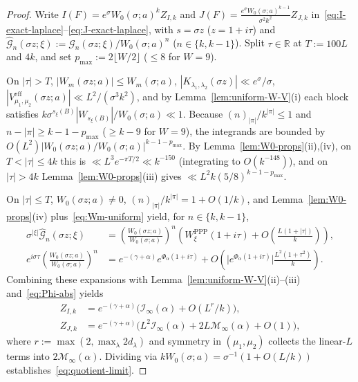 \documentclass[11pt, reqno]{amsart}
\theoremstyle{remark}
\numberwithin{equation}{section}
\newcommand{\R}{\mathbb{R}}
\newcommand{\cG}{\mathcal{G}}
\begin{document}
\begin{proof}
Write $I(F) = e^\sigma W_0(\sigma; a)^k Z_{I,k}$ and $J(F) = \frac{e^\sigma W_0(\sigma; a)^{k-1}}{\sigma^2 k^2} Z_{J,k}$
in~\eqref{eq:I-exact-laplace}--\eqref{eq:J-exact-laplace}, with $s = \sigma z$ ($z = 1+i\tau$) and
$\widehat{\cG}_n(\sigma z;\xi) := \cG_n(\sigma z;\xi)/W_0(\sigma;a)^n$ ($n \in \{k, k-1\}$). Split $\tau \in \R$
at $T := 100 L$ and $4k$, and set $p_{\max} := 2\lfloor W/2\rfloor$ ($\le 8$ for $W=9$).

On $|\tau| > T$, $|W_m(\sigma z; a)| \le W_m(\sigma; a)$, $|K_{\lambda_1,\lambda_2}(\sigma z)| \ll e^\sigma/\sigma$,
$|V_{\mu_1,\mu_2}^{\mathrm{eff}}(\sigma z; a)| \ll L^2/(\sigma^3 k^2)$, and by Lemma~\ref{lem:uniform-W-V}(i)
each block satisfies $k\sigma^{s_\xi(B)}|W_{s_\xi(B)}|/W_0(\sigma;a) \ll 1$. Because $(n)_{|\pi|}/k^{|\pi|} \le 1$
and $n - |\pi| \ge k - 1 - p_{\max}$ ($\ge k-9$ for $W=9$), the integrands are bounded by
$O(L^2)|W_0(\sigma z;a)/W_0(\sigma;a)|^{k-1-p_{\max}}$. By Lemma~\ref{lem:W0-props}(ii),(iv), on $T < |\tau| \le 4k$
this is $\ll L^3 e^{-\pi T/2} \ll k^{-150}$ (integrating to $O(k^{-148})$), and on $|\tau| > 4k$ Lemma~\ref{lem:W0-props}(iii)
gives $\ll L^2 k (5/8)^{k-1-p_{\max}}$.

On $|\tau| \le T$, $W_0(\sigma z;a) \neq 0$, $(n)_{|\pi|}/k^{|\pi|} = 1 + O(1/k)$, and
Lemma~\ref{lem:W0-props}(iv) plus~\eqref{eq:Wm-uniform} yield, for $n \in \{k, k-1\}$,
\begin{align*}
\sigma^{|\xi|}\widehat{\cG}_n(\sigma z;\xi)
&= \left(\frac{W_0(\sigma z;a)}{W_0(\sigma;a)}\right)^{\!n}
\left(W_\xi^{\mathrm{PPP}}(1+i\tau) + O\!\left(\frac{L(1+|\tau|)}{k}\right)\right), \\
e^{i\sigma\tau}\left(\frac{W_0(\sigma z;a)}{W_0(\sigma;a)}\right)^{\!n}
&= e^{-(\gamma+\alpha)} e^{\Phi_\alpha(1+i\tau)}
+ O\!\left(\bigl|e^{\Phi_\alpha(1+i\tau)}\bigr|\frac{L^2(1+\tau^2)}{k}\right).
\end{align*}
Combining these expansions with Lemma~\ref{lem:uniform-W-V}(ii)--(iii) and~\eqref{eq:Phi-abs} yields
\begin{align*}
Z_{I,k} &= e^{-(\gamma+\alpha)}\bigl(\mathcal{I}_\infty(\alpha) + O(L^r/k)\bigr), \\
Z_{J,k} &= e^{-(\gamma+\alpha)}\bigl(L^2\mathcal{I}_\infty(\alpha) + 2L\mathcal{M}_\infty(\alpha) + O(1)\bigr),
\end{align*}
where $r := \max(2, \max_\lambda 2d_\lambda)$ and symmetry in $(\mu_1,\mu_2)$ collects the
linear-$L$ terms into $2\mathcal{M}_\infty(\alpha)$. Dividing via $k W_0(\sigma; a) = \sigma^{-1}(1 + O(L/k))$
establishes~\eqref{eq:quotient-limit}.
\end{proof}
\end{document}
